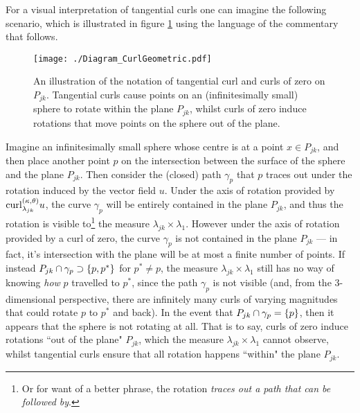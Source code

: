 For a visual interpretation of tangential curls one can imagine the following scenario, which is illustrated in figure \ref{fig:Diagram_CurlGeometric} using the language of the commentary that follows.
\begin{figure}[t!]
	\centering
	\texttt{[image: ./Diagram\_CurlGeometric.pdf]}
	\caption[Geometric interpretation of tangential curls with respect to $\dddmes$.]{\label{fig:Diagram_CurlGeometric} An illustration of the notation of tangential curl and curls of zero on $P_{jk}$. Tangential curls cause points on an (infinitesimally small) sphere to rotate within the plane $P_{jk}$, whilst curls of zero induce rotations that move points on the sphere out of the plane.}
\end{figure}
Imagine an infinitesimally small sphere whose centre is at a point $x\in P_{jk}$, and then place another point $p$ on the intersection between the surface of the sphere and the plane $P_{jk}$.
Then consider the (closed) path $\gamma_p$ that $p$ traces out under the rotation induced by the vector field $u$.
Under the axis of rotation provided by $\mathrm{curl}_{\lambda_{jk}}^{\left( \kappa, \theta \right)}u$, the curve $\gamma_p$ will be entirely contained in the plane $P_{jk}$, and thus the rotation is visible to\footnote{Or for want of a better phrase, the rotation \emph{traces out a path that can be followed by}.} the measure $\lambda_{jk}\times\lambda_1$.
However under the axis of rotation provided by a curl of zero, the curve $\gamma_p$ is not contained in the plane $P_{jk}$ --- in fact, it's intersection with the plane will be at most a finite number of points.
If instead $P_{jk}\cap\gamma_p\supset\left\{ p,p^* \right\}$ for $p^*\neq p$, the measure $\lambda_{jk}\times\lambda_1$ still has no way of knowing \emph{how} $p$ travelled to $p^*$, since the path $\gamma_p$ is not visible (and, from the 3-dimensional perspective, there are infinitely many curls of varying magnitudes that could rotate $p$ to $p^*$ and back).
In the event that $P_{jk}\cap\gamma_p=\left\{ p \right\}$, then it appears that the sphere is not rotating at all.
That is to say, curls of zero induce rotations ``out of the plane" $P_{jk}$, which the measure $\lambda_{jk}\times\lambda_1$ cannot observe, whilst tangential curls ensure that all rotation happens ``within" the plane $P_{jk}$.

